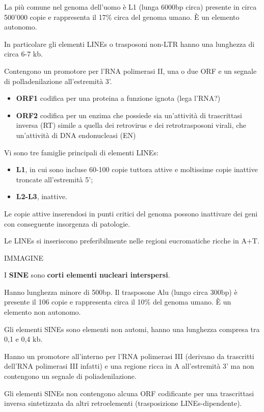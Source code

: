 \documentclass[]{article}
\begin{document}
La più comune nel genoma dell'uomo è L1 (lunga 6000bp circa) presente in
circa 500'000 copie e rappresenta il 17\% circa del genoma umano. È un
elemento autonomo.

In particolare gli elementi LINEs o trasposoni non-LTR hanno una
lunghezza di circa 6-7 kb.

Contengono un promotore per l'RNA polimerasi II, una o due ORF e un
segnale di polladenilazione all'estremità 3'.

\begin{itemize}
\itemsep1pt\parskip0pt
\item
  \textbf{ORF1} codifica per una proteina a funzione ignota (lega
  l'RNA?)
\item
  \textbf{ORF2} codifica per un enzima che possiede sia un'attività di
  trascrittasi inversa (RT) simile a quella dei retrovirus e dei
  retrotrasposoni virali, che un'attività di DNA endonucleasi (EN)
\end{itemize}

Vi sono tre famiglie principali di elementi LINEs:

\begin{itemize}
\itemsep1pt\parskip0pt
\item
  \textbf{L1}, in cui sono incluse 60-100 copie tuttora attive e
  moltissime copie inattive troncate all'estremità 5';
\item
  \textbf{L2-L3}, inattive.
\end{itemize}

Le copie attive inserendosi in punti critici del genoma possono
inattivare dei geni con conseguente insorgenza di patologie.

Le LINEs si inseriscono preferibilmente nelle regioni eucromatiche
ricche in A+T.

IMMAGINE

I \textbf{SINE} sono \textbf{corti elementi nucleari interspersi}.

Hanno lunghezza minore di 500bp. Il trasposone Alu (lungo circa 300bp) è
presente il 106 copie e rappresenta circa il 10\% del genoma umano. È un
elemento non autonomo.

Gli elementi SINEs sono elementi non automi, hanno una lunghezza
compresa tra 0,1 e 0,4 kb.

Hanno un promotore all'interno per l'RNA polimerasi III (derivano da
trascritti dell'RNA polimerasi III infatti) e una regione ricca in A
all'estremità 3' ma non contengono un segnale di poliadenilazione.

Gli elementi SINEs non contengono alcuna ORF codificante per una
trascrittasi inversa sintetizzata da altri retroelementi (trasposizione
LINEs-dipendente).
\end{document}
